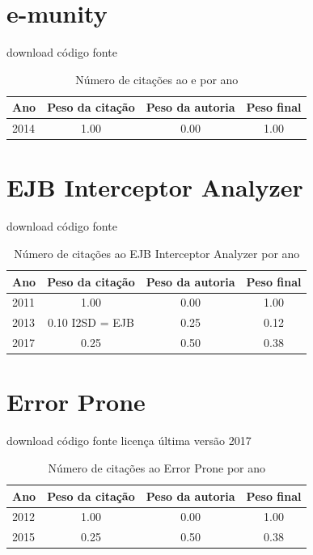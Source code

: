 \section{e-munity}
\checkmark download
\checkmark código fonte
\begin{table}[H]
\caption{Número de citações ao e por ano}
\centering
\begin{tabular}{| l | c | c | c |}
  \hline
  Ano & Peso da citação & Peso da autoria & Peso final \\
  \hline
  2014
    & 1.00
    & 0.00
    & {\color{blue} 1.00} \\
\hline
\end{tabular}
\end{table}
\section{EJB Interceptor Analyzer}
\checkmark download
\checkmark código fonte
\begin{table}[H]
\caption{Número de citações ao EJB Interceptor Analyzer por ano}
\centering
\begin{tabular}{| l | c | c | c |}
  \hline
  Ano & Peso da citação & Peso da autoria & Peso final \\
  \hline
  2011
    & 1.00
    & 0.00
    & {\color{blue} 1.00} \\
\hline
  2013
    & 0.10
          {\tiny I2SD = EJB}
    & 0.25
    & {\color{red} 0.12} \\
\hline
  2017
    & 0.25
    & 0.50
    & {\color{red} 0.38} \\
\hline
\end{tabular}
\end{table}
\section{Error Prone}
\checkmark download
\checkmark código fonte
\checkmark licença
\checkmark última versão 2017
\begin{table}[H]
\caption{Número de citações ao Error Prone por ano}
\centering
\begin{tabular}{| l | c | c | c |}
  \hline
  Ano & Peso da citação & Peso da autoria & Peso final \\
  \hline
  2012
    & 1.00
    & 0.00
    & {\color{blue} 1.00} \\
\hline
  2015
    & 0.25
    & 0.50
    & {\color{red} 0.38} \\
\hline
\end{tabular}
\end{table}
